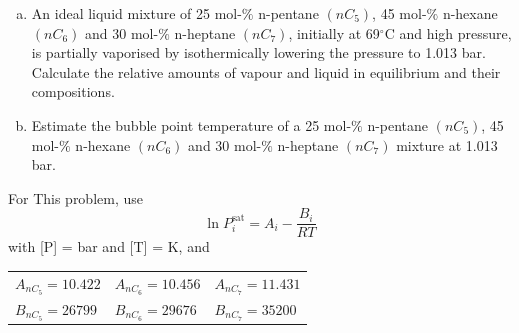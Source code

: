 \documentclass[calculator,steamtables,datasheet,solutions]{exam}
\newcommand{\frc}{\displaystyle\frac}
\begin{document}
\clearpage

\begin{question}
%
\begin{enumerate}[(a)]
\item\label{Example_03} An ideal liquid mixture of 25 mol-$\%$ n-pentane $\left(nC_{5}\right)$, 45 mol-$\%$ n-hexane $\left(nC_{6}\right)$ and 30 mol-$\%$ n-heptane $\left(nC_{7}\right)$, initially at 69$^{\circ}$C and high pressure, is partially vaporised by isothermically lowering the pressure to 1.013 bar. Calculate the relative amounts of vapour and liquid in equilibrium and their compositions.~

\item Estimate the bubble point temperature of a 25 mol-$\%$ n-pentane $\left(nC_{5}\right)$, 45 mol-$\%$ n-hexane $\left(nC_{6}\right)$ and 30 mol-$\%$ n-heptane $\left(nC_{7}\right)$ mixture at 1.013 bar.~
%
\end{enumerate}

For This problem, use 
\begin{displaymath}
   \ln P_{i}^{\text{sat}} = A_{i} - \frc{B_{i}}{RT}
\end{displaymath} 
with [P] = bar and [T] = K, and
    \begin{center}
       \begin{tabular}{l l l} 
          $A_{nC_{5}}=10.422$ & $A_{nC_{6}}=10.456$ & $A_{nC_{7}}=11.431$ \\
          $B_{nC_{5}}=26799$  & $B_{nC_{6}}=29676$  & $B_{nC_{7}}=35200$  
       \end{tabular}
    \end{center}
%
\end{question}

\clearpage
\end{document}
